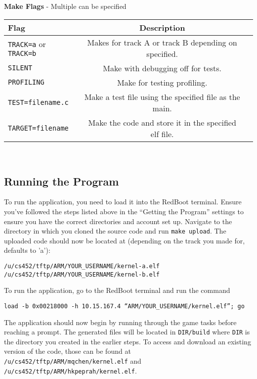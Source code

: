 \documentclass[12pt]{article}
\begin{document}
\begin{center}
  {\bf Make Flags} - Multiple can be specified
  \begin{tabular}{|l|c|c|}
    \hline
    {\bf Flag} & {\bf Description} \\\hline
    \texttt{TRACK=a} or \texttt{TRACK=b} & Makes for track A or track B depending on specified. \\\hline
    \texttt{SILENT} & Make with debugging off for tests. \\\hline
    \texttt{PROFILING} & Make for testing profiling. \\\hline
    \texttt{TEST=filename.c} & Make a test file using the specified file as the main. \\\hline
    \texttt{TARGET=filename} & Make the code and store it in the specified elf file. \\\hline
  \end{tabular}
\end{center}
\\[1\baselineskip]
\subsection{Running the Program}
To run the application, you need to load it into the RedBoot terminal.  Ensure you've followed the steps listed above in the ``Getting the Program'' settings to ensure you have the correct directories and account set up.  Navigate to the directory in which you cloned the source code and run \texttt{make upload}.  The uploaded code should now be located at (depending on the track you made for, defaults to 'a'):
\begin{center}
  \texttt{/u/cs452/tftp/ARM/YOUR\_USERNAME/kernel-a.elf} \\
  \texttt{/u/cs452/tftp/ARM/YOUR\_USERNAME/kernel-b.elf}
\end{center}
To run the application, go to the RedBoot terminal and run the command
\begin{center}
  \texttt{load -b 0x00218000 -h 10.15.167.4 ``ARM/YOUR\_USERNAME/kernel.elf''; go}
\end{center}
The application should now begin by running through the game tasks before reaching a prompt.  The generated files will be located in \texttt{DIR/build} where \texttt{DIR} is the directory you created in the earlier steps.  To access and download an existing version of the code, those can be found at \texttt{/u/cs452/tftp/ARM/mqchen/kernel.elf} and \texttt{/u/cs452/tftp/ARM/hkpeprah/kernel.elf}.
\\
\end{document}
